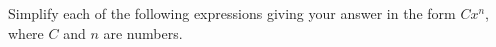 \hlquestion Simplify each of the following expressions giving your answer in the 
form $Cx^{n}$, where $C$ and $n$ are numbers.
\begin{multicols}{3}
\end{multicols}

